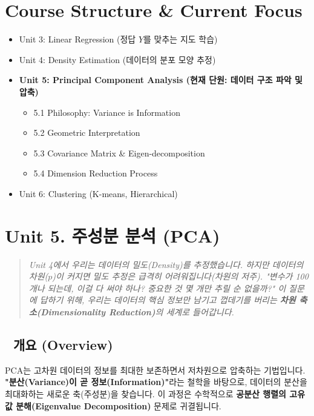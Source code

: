 \documentclass[11pt,a4paper]{book}
\theoremstyle{definition}
\begin{document}
\section*{Course Structure \& Current Focus}
\begin{itemize}
    \item Unit 3: Linear Regression (정답 $Y$를 맞추는 지도 학습)
    \item Unit 4: Density Estimation (데이터의 분포 모양 추정)
    \item \textbf{\textcolor{mainblue}{Unit 5: Principal Component Analysis (현재 단원: 데이터 구조 파악 및 압축)}}
    \begin{itemize}
        \item 5.1 Philosophy: Variance is Information
        \item 5.2 Geometric Interpretation
        \item 5.3 Covariance Matrix \& Eigen-decomposition
        \item 5.4 Dimension Reduction Process
    \end{itemize}
    \item Unit 6: Clustering (K-means, Hierarchical)
\end{itemize}


\section{Unit 5. 주성분 분석 (PCA)}

\begin{quote}
\textit{Unit 4에서 우리는 데이터의 밀도(Density)를 추정했습니다. 하지만 데이터의 차원($p$)이 커지면 밀도 추정은 급격히 어려워집니다(차원의 저주). "변수가 100개나 되는데, 이걸 다 써야 하나? 중요한 것 몇 개만 추릴 순 없을까?" 이 질문에 답하기 위해, 우리는 데이터의 핵심 정보만 남기고 껍데기를 버리는 \textbf{차원 축소(Dimensionality Reduction)}의 세계로 들어갑니다.}
\end{quote}

\subsection*{📌 개요 (Overview)}
PCA는 고차원 데이터의 정보를 최대한 보존하면서 저차원으로 압축하는 기법입니다. \textbf{"분산(Variance)이 곧 정보(Information)"}라는 철학을 바탕으로, 데이터의 분산을 최대화하는 새로운 축(주성분)을 찾습니다. 이 과정은 수학적으로 \textbf{공분산 행렬의 고유값 분해(Eigenvalue Decomposition)} 문제로 귀결됩니다.
\end{document}
